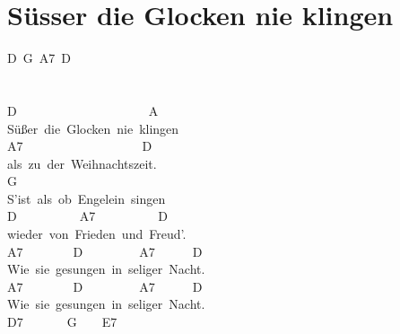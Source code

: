 \documentclass[]{book}
\let\stdsection\section
\renewcommand\section{\clearpage\stdsection}
\begin{document}
\hypertarget{susser-die-glocken-nie-klingen}{%
\section{Süsser die Glocken nie klingen}\label{susser-die-glocken-nie-klingen}}

D~G~A7~D\\
~\\
~\\
D~~~~~~~~~~~~~~~~~~~~~A\\
Süßer~die~Glocken~nie~klingen\\
A7~~~~~~~~~~~~~~~~~~~D\\
als~zu~der~Weihnachtszeit.\\
\hspace*{0.333em}\hspace*{0.333em}\hspace*{0.333em}\hspace*{0.333em}\hspace*{0.333em}\hspace*{0.333em}\hspace*{0.333em}\hspace*{0.333em}\hspace*{0.333em}\hspace*{0.333em}\hspace*{0.333em}\hspace*{0.333em}\hspace*{0.333em}\hspace*{0.333em}\hspace*{0.333em}\hspace*{0.333em}\hspace*{0.333em}\hspace*{0.333em}\hspace*{0.333em}\hspace*{0.333em}\hspace*{0.333em}\hspace*{0.333em}G\\
S'ist~als~ob~Engelein~singen\\
D~~~~~~~~~~A7~~~~~~~~~~D\\
wieder~von~Frieden~und~Freud'.\\
A7~~~~~~~~D~~~~~~~~~A7~~~~~~D\\
Wie~sie~gesungen~in~seliger~Nacht.\\
A7~~~~~~~~D~~~~~~~~~A7~~~~~~D\\
Wie~sie~gesungen~in~seliger~Nacht.\\
\hspace*{0.333em}\hspace*{0.333em}\hspace*{0.333em}\hspace*{0.333em}\hspace*{0.333em}\hspace*{0.333em}\hspace*{0.333em}\hspace*{0.333em}\hspace*{0.333em}\hspace*{0.333em}\hspace*{0.333em}\hspace*{0.333em}D7~~~~~~~G~~~~E7\\
\end{document}
